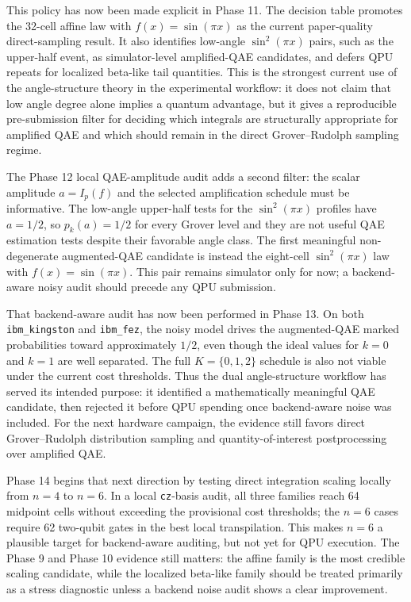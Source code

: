 This policy has now been made explicit in Phase 11. The decision table promotes
the 32-cell affine law with \(f(x)=\sin(\pi x)\) as the current paper-quality
direct-sampling result. It also identifies low-angle \(\sin^2(\pi x)\) pairs,
such as the upper-half event, as simulator-level amplified-QAE candidates, and
defers QPU repeats for localized beta-like tail quantities. This is the
strongest current use of the angle-structure theory in the experimental
workflow: it does not claim that low angle degree alone implies a quantum
advantage, but it gives a reproducible pre-submission filter for deciding which
integrals are structurally appropriate for amplified QAE and which should remain
in the direct Grover--Rudolph sampling regime.

The Phase 12 local QAE-amplitude audit adds a second filter: the scalar
amplitude \(a=I_p(f)\) and the selected amplification schedule must be
informative. The low-angle upper-half tests for the \(\sin^2(\pi x)\) profiles
have \(a=1/2\), so \(p_k(a)=1/2\) for every Grover level and they are not useful
QAE estimation tests despite their favorable angle class. The first meaningful
non-degenerate augmented-QAE candidate is instead the eight-cell
\(\sin^2(\pi x)\) law with \(f(x)=\sin(\pi x)\). This pair remains simulator
only for now; a backend-aware noisy audit should precede any QPU submission.

That backend-aware audit has now been performed in Phase 13. On both
\texttt{ibm\_kingston} and \texttt{ibm\_fez}, the noisy model drives the
augmented-QAE marked probabilities toward approximately \(1/2\), even though
the ideal values for \(k=0\) and \(k=1\) are well separated. The full
\(K=\{0,1,2\}\) schedule is also not viable under the current cost thresholds.
Thus the dual angle-structure workflow has served its intended purpose: it
identified a mathematically meaningful QAE candidate, then rejected it before
QPU spending once backend-aware noise was included. For the next hardware
campaign, the evidence still favors direct Grover--Rudolph distribution
sampling and quantity-of-interest postprocessing over amplified QAE.

Phase 14 begins that next direction by testing direct integration scaling
locally from \(n=4\) to \(n=6\). In a local \texttt{cz}-basis audit, all three
families reach 64 midpoint cells without exceeding the provisional cost
thresholds; the \(n=6\) cases require 62 two-qubit gates in the best local
transpilation. This makes \(n=6\) a plausible target for backend-aware auditing,
but not yet for QPU execution. The Phase 9 and Phase 10 evidence still matters:
the affine family is the most credible scaling candidate, while the localized
beta-like family should be treated primarily as a stress diagnostic unless a
backend noise audit shows a clear improvement.

